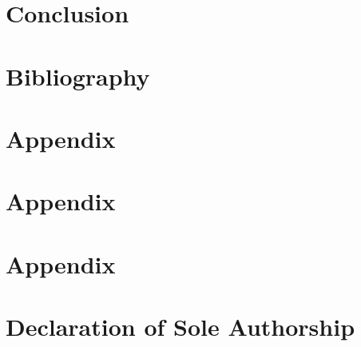 \documentclass[12pt, letterpaper]{article}
\begin{document}
\section{Conclusion}

\pagebreak

\section{Bibliography}
\printbibliography[heading=none]
\pagebreak

\appendix
\section{Appendix}
\label{appendix:a}

\pagebreak

\section{Appendix}
\label{appendix:b}

\pagebreak

\section{Appendix}
\label{appendix:c}

\pagebreak

\section*{Declaration of Sole Authorship}

\end{document}
